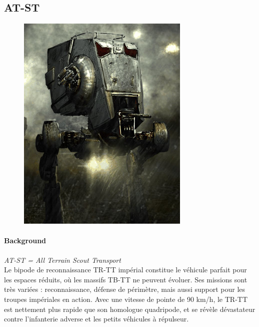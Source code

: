 \subsection{AT-ST} \label{sec:at-st}
\begin{figure}[h!]
    \centering
    \includegraphics[width=\linewidth]{_img/bestiary/atst.jpg}
\end{figure}

\paragraph{Background}
\textit{AT-ST = All Terrain Scout Transport}\\ 
Le bipode de reconnaissance TR-TT impérial constitue le véhicule parfait pour les espaces réduits, où les massifs TB-TT ne peuvent évoluer. Ses missions sont très variées : reconnaissance, défense de périmètre, mais aussi support pour les troupes impériales en action. Avec une vitesse de pointe de 90 km/h, le TR-TT est nettement plus rapide que son homologue quadripode, et se révèle dévastateur contre l'infanterie adverse et les petits véhicules à répulseur. 

